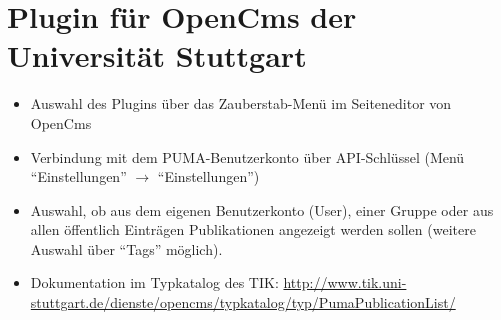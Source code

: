 \section{Plugin für OpenCms der Universität Stuttgart}
\begin{itemize}
\item Auswahl des Plugins über das Zauberstab-Menü im Seiteneditor von OpenCms
\item Verbindung mit dem PUMA-Benutzerkonto über API-Schlüssel (\mbox{Menü} \enquote{Einstellungen} $\to$ \enquote{Einstellungen})
\item Auswahl, ob aus dem eigenen Benutzerkonto (User), einer Gruppe oder aus allen öffentlich Einträgen Publikationen angezeigt werden sollen (weitere Auswahl über \enquote{Tags} möglich).
\item Dokumentation im Typkatalog des TIK: \newline \url{http://www.tik.uni-stuttgart.de/dienste/opencms/typkatalog/typ/PumaPublicationList/}
\end{itemize} 

